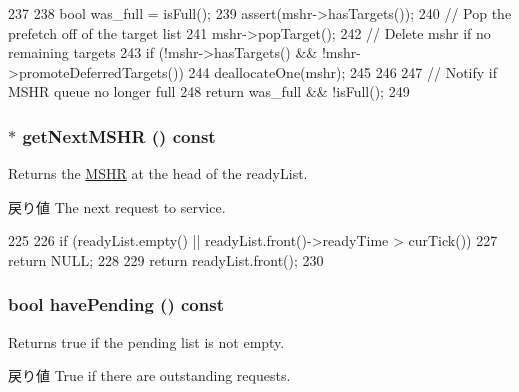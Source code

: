 \begin{DoxyCode}
237 {
238     bool was_full = isFull();
239     assert(mshr->hasTargets());
240     // Pop the prefetch off of the target list
241     mshr->popTarget();
242     // Delete mshr if no remaining targets
243     if (!mshr->hasTargets() && !mshr->promoteDeferredTargets()) {
244         deallocateOne(mshr);
245     }
246 
247     // Notify if MSHR queue no longer full
248     return was_full && !isFull();
249 }
\end{DoxyCode}
\hypertarget{classMSHRQueue_a98b9ba341284c5251a7908cd45918066}{
\subsubsection[{getNextMSHR}]{$\ast$ getNextMSHR () const}}
\label{classMSHRQueue_a98b9ba341284c5251a7908cd45918066}
Returns the \hyperlink{classMSHR}{MSHR} at the head of the readyList. \begin{DoxyReturn}{戻り値}
The next request to service. 
\end{DoxyReturn}



\begin{DoxyCode}
225     {
226         if (readyList.empty() || readyList.front()->readyTime > curTick()) {
227             return NULL;
228         }
229         return readyList.front();
230     }
\end{DoxyCode}
\hypertarget{classMSHRQueue_aef5fae0b3798035ac6f7ad1ab9038aca}{
\subsubsection[{havePending}]{\setlength{\rightskip}{0pt plus 5cm}bool havePending () const}}
\label{classMSHRQueue_aef5fae0b3798035ac6f7ad1ab9038aca}
Returns true if the pending list is not empty. \begin{DoxyReturn}{戻り値}
True if there are outstanding requests. 
\end{DoxyReturn}



